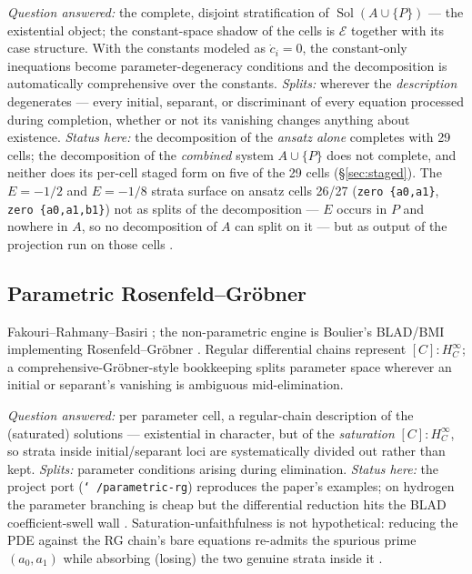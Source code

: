 \documentclass[11pt]{article}
\newcommand{\Ex}{\mathcal{E}}
\newcommand{\code}[1]{\texttt{#1}}
\DeclareMathOperator{\Sol}{Sol}
\begin{document}
\emph{Question answered:} the complete, disjoint stratification of
$\Sol(A\cup\{P\})$ --- the existential object; the constant-space shadow of the
cells is $\Ex$ together with its case structure. With the constants modeled as
$\dot c_i = 0$, the constant-only inequations become parameter-degeneracy
conditions and the decomposition is automatically comprehensive over the
constants. \emph{Splits:} wherever the \emph{description} degenerates ---
every initial, separant, or discriminant of every equation processed during
completion, whether or not its vanishing changes anything about existence.
\emph{Status here:} the decomposition of the \emph{ansatz alone} completes
with 29 cells; the decomposition of the \emph{combined} system $A\cup\{P\}$
does not complete, and neither does its per-cell staged form on five of the
29 cells (\S\ref{sec:staged}). The $E=-1/2$ and $E=-1/8$ strata surface on
ansatz cells 26/27 (\code{zero \{a0,a1\}}, \code{zero \{a0,a1,b1\}}) not as
splits of the decomposition --- $E$ occurs in $P$ and nowhere in $A$, so no
decomposition of $A$ can split on it --- but as output of the projection
run on those cells \cite{existence-route-report,joca-thomas-report}.

\subsection{Parametric Rosenfeld--Gr\"obner}

Fakouri--Rahmany--Basiri \cite{fakouri}; the non-parametric engine is
Boulier's BLAD/BMI implementing Rosenfeld--Gr\"obner \cite{blop}. Regular
differential chains represent $[C]:H_C^\infty$; a comprehensive-Gr\"obner-style
bookkeeping splits parameter space wherever an initial or separant's vanishing
is ambiguous mid-elimination.

\emph{Question answered:} per parameter cell, a regular-chain description of
the (saturated) solutions --- existential in character, but of the
\emph{saturation} $[C]:H_C^\infty$, so strata inside initial/separant loci are
systematically divided out rather than kept. \emph{Splits:} parameter
conditions arising during elimination. \emph{Status here:} the project port
(\code{\char`~/parametric-rg}) reproduces the paper's examples; on hydrogen
the parameter branching is cheap but the differential reduction hits the BLAD
coefficient-swell wall \cite{method-comparison}. Saturation-unfaithfulness is
not hypothetical: reducing the PDE against the RG chain's bare equations
re-admits the spurious prime $(a_0,a_1)$ while absorbing (losing) the two
genuine strata inside it \cite[\code{joca-rg.sage} discussion]{README}.
\end{document}
